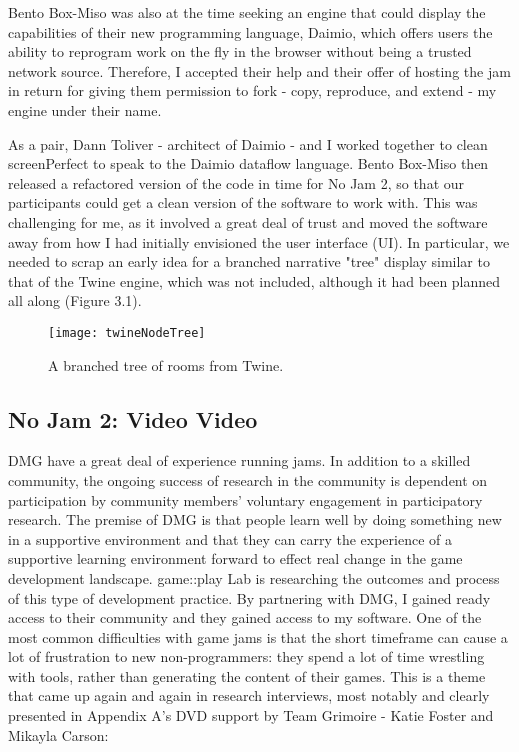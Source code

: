 Bento Box-Miso was also at the time seeking an engine that could display the capabilities of their new programming language, Daimio, which offers users the ability to reprogram work on the fly in the browser without being a trusted network source. Therefore, I accepted their help and their offer of hosting the jam in return for giving them permission to fork - copy, reproduce, and extend - my engine under their name. 

As a pair, Dann Toliver - architect of Daimio - and I worked together to clean screenPerfect to speak to the Daimio dataflow language. Bento Box-Miso then released a refactored version of the code in time for No Jam 2, so that our participants could get a clean version of the software to work with. This was challenging for me, as it involved a great deal of trust and moved the software away from how I had initially envisioned the user interface (UI). In particular, we needed to scrap an early idea for a branched narrative "tree" display similar to that of the Twine engine, which was not included, although it had been planned all along (Figure 3.1).

\newpage
\begin{figure}[h!]
 \centering
 \texttt{[image: twineNodeTree]}
 \caption{A branched tree of rooms from Twine.}
\end{figure}
\newpage

\subsection{No Jam 2: Video Video}
DMG have a great deal of experience running jams. In addition to a skilled community, the ongoing success of research in the community is dependent on participation by community members' voluntary engagement in participatory research. The premise of DMG is that people learn well by doing something new in a supportive environment and that they can carry the experience of a supportive learning environment forward to effect real change in the game development landscape. game::play Lab is researching the outcomes and process of this type of development practice. By partnering with DMG, I gained ready access to their community and they gained access to my software. One of the most common difficulties with game jams is that the short timeframe can cause a lot of frustration to new non-programmers: they spend a lot of time wrestling with tools, rather than generating the content of their games. This is a theme that came up again and again in research interviews, most notably and clearly presented in Appendix A's DVD support by Team Grimoire - Katie Foster and Mikayla Carson:

